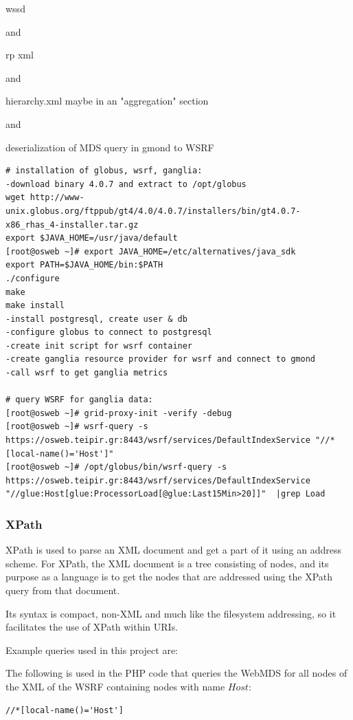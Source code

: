 wssd

and

rp xml

and

hierarchy.xml maybe in an "aggregation" section

and

deserialization of MDS query in gmond to WSRF
 
\begin{verbatim}
# installation of globus, wsrf, ganglia:
-download binary 4.0.7 and extract to /opt/globus
wget http://www-unix.globus.org/ftppub/gt4/4.0/4.0.7/installers/bin/gt4.0.7-x86_rhas_4-installer.tar.gz
export $JAVA_HOME=/usr/java/default
[root@osweb ~]# export JAVA_HOME=/etc/alternatives/java_sdk
export PATH=$JAVA_HOME/bin:$PATH
./configure
make
make install
-install postgresql, create user & db
-configure globus to connect to postgresql
-create init script for wsrf container
-create ganglia resource provider for wsrf and connect to gmond
-call wsrf to get ganglia metrics

# query WSRF for ganglia data:
[root@osweb ~]# grid-proxy-init -verify -debug
[root@osweb ~]# wsrf-query -s https://osweb.teipir.gr:8443/wsrf/services/DefaultIndexService "//*[local-name()='Host']"
[root@osweb ~]# /opt/globus/bin/wsrf-query -s https://osweb.teipir.gr:8443/wsrf/services/DefaultIndexService "//glue:Host[glue:ProcessorLoad[@glue:Last15Min>20]]"  |grep Load
\end{verbatim}

\subsubsection{XPath}

XPath is used to parse an XML document and get a part of it using an address scheme. For XPath, the XML document is a tree consisting of nodes, and its purpose as a language is to get the nodes that are addressed using the XPath query from that document.

Its syntax is compact, non-XML and much like the filesystem addressing, so it facilitates the use of XPath within URIs.

Example queries used in this project are:

The following is used in the PHP code that queries the WebMDS for all nodes of the XML of the WSRF containing nodes with name $Host$:
\begin{verbatim}
//*[local-name()='Host']
\end{verbatim}

